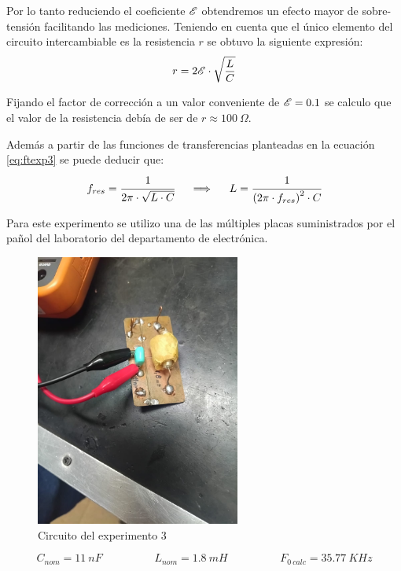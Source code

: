 Por lo tanto reduciendo el coeficiente $\mathscr{E}$ obtendremos un efecto mayor de sobre-tensión facilitando las mediciones. Teniendo en cuenta que el único elemento del circuito intercambiable es la resistencia $r$ se obtuvo la siguiente expresión:
\begin{equation}
    r=2\mathscr{E}\cdot\sqrt{\frac{L}{C}}
\end{equation}

Fijando el factor de corrección a un valor conveniente de $\mathscr{E}=0.1$ se calculo que el valor de la resistencia debía de ser de $r\approx 100~\Omega$.

Además a partir de las funciones de transferencias planteadas en la ecuación \ref{eq:ftexp3} se puede deducir que:
\begin{equation}
    f_{res} = \cfrac{1}{2 \pi \cdot \sqrt{L \cdot C}}
  \hspace{5mm}\Longrightarrow\hspace{5mm}
    L = \cfrac{1}{{\left( 2\pi \cdot f_{res} \right)}^2 \cdot C} 
\end{equation}

Para este experimento se utilizo una de las múltiples placas suministrados por el pañol del laboratorio del departamento de electrónica.
\begin{figure}[H]
    \centering
    \includegraphics[width=0.6\textwidth,trim={1cm 20cm 4cm 10cm},clip]{Imagenes/CircExp3.jpeg}
    \caption{Circuito del experimento 3}
\end{figure}
\begin{equation*}
    C_{nom} = 11 ~nF  
    \hspace{2cm}
    L_{nom} = 1.8 ~mH
    \hspace{2cm}
    F_{0~calc}=35.77~KHz
\end{equation*}

